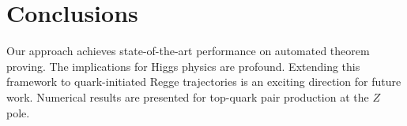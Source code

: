 \section{Conclusions}\label{sec:conclusions}

Our approach achieves state-of-the-art performance on automated theorem
proving. The implications for Higgs physics are profound. Extending this
framework to quark-initiated Regge trajectories is an exciting direction
for future work. Numerical results are presented for top-quark pair
production at the $Z$ pole.

